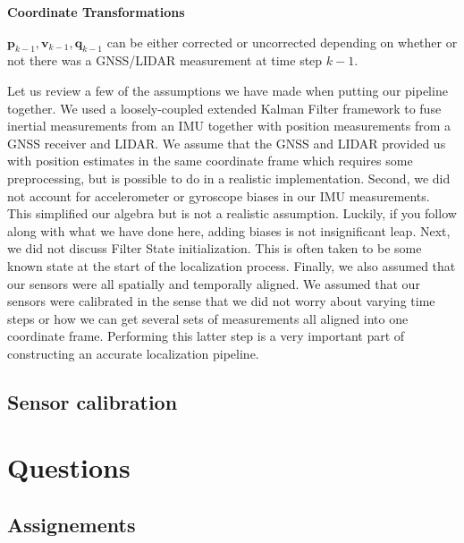 \begin{framed}
\theoremstyle{remark}
\begin{remark}{\textbf{Coordinate Transformations}}

$\mathbf{p}_{k-1}, \mathbf{v}_{k-1}, \mathbf{q}_{k-1}$ can be either corrected or uncorrected depending on whether or not there was
a GNSS/LIDAR measurement at time step $k-1$. 
\end{remark}
\end{framed}

Let us review a few of the assumptions we have made when putting
our pipeline together. We used a loosely-coupled extended Kalman
Filter framework to fuse inertial measurements from an IMU together with position measurements
from a GNSS receiver and LIDAR. We assume that the GNSS and LIDAR provided us with position estimates in the same coordinate frame which requires
some preprocessing, but is possible to do in a realistic
implementation. Second, we did not account for accelerometer or gyroscope biases in our IMU measurements. This simplified
our algebra but is not a realistic assumption. Luckily, if you follow along with what
we have done here, adding biases is not insignificant leap. Next, we did not discuss Filter State
initialization. This is often taken to be some known state at the start of the localization process. Finally, we also assumed that our
sensors were all spatially and temporally aligned. We assumed that
our sensors were calibrated in the sense that we did not worry about varying time steps or how we can get several sets of
measurements all aligned into one coordinate frame. Performing
this latter step is a very important part of constructing an accurate localization pipeline. 

\subsection{Sensor calibration}
\label{sensor_calibration}
 

\section{Questions}
\label{questions_sensor_fusion}

\subsection{Assignements}
\label{assignements_sensor_fusion}



